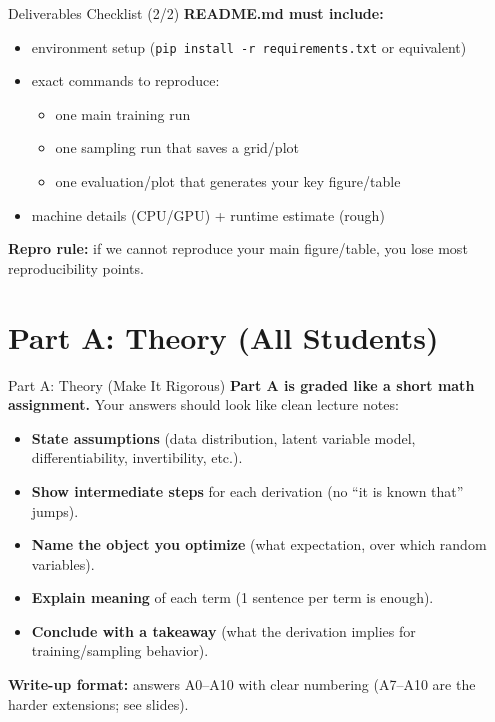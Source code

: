 \documentclass[aspectratio=169]{beamer}
\begin{document}
\begin{frame}{Deliverables Checklist (2/2)}
\scriptsize
\textbf{README.md must include:}
\begin{itemize}
  \item environment setup (\texttt{pip install -r requirements.txt} or equivalent)
  \item exact commands to reproduce:
  \begin{itemize}
    \item one main training run
    \item one sampling run that saves a grid/plot
    \item one evaluation/plot that generates your key figure/table
  \end{itemize}
  \item machine details (CPU/GPU) + runtime estimate (rough)
\end{itemize}

\vspace{0.4em}
\textbf{Repro rule:} if we cannot reproduce your main figure/table, you lose most reproducibility points.
\end{frame}

\section{Part A: Theory (All Students)}

\begin{frame}{Part A: Theory (Make It Rigorous)}
\small
\textbf{Part A is graded like a short math assignment.} Your answers should look like clean lecture notes:
\begin{itemize}
  \item \textbf{State assumptions} (data distribution, latent variable model, differentiability, invertibility, etc.).
  \item \textbf{Show intermediate steps} for each derivation (no ``it is known that'' jumps).
  \item \textbf{Name the object you optimize} (what expectation, over which random variables).
  \item \textbf{Explain meaning} of each term (1 sentence per term is enough).
  \item \textbf{Conclude with a takeaway} (what the derivation implies for training/sampling behavior).
\end{itemize}
\vspace{0.3em}
\textbf{Write-up format:} answers A0--A10 with clear numbering (A7--A10 are the harder extensions; see slides).
\end{frame}
\end{document}
